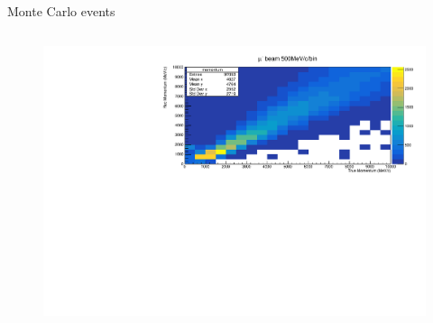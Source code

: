 \documentclass[11pt]{beamer}
\begin{document}
\begin{frame}{Monte Carlo events}

\begin{columns}[T] %
	\begin{column}{.48\textwidth}
		
		\begin{figure}[h!]
			\centering
			\includegraphics[width=\textwidth]{MomentumMuonBeam.pdf}
			

\end{figure}
\end{column}
\end{columns}
\end{frame}
\end{document}
